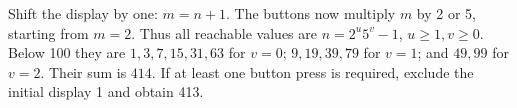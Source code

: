Shift the display by one: $m=n+1$. The buttons now multiply $m$ by 2 or 5, starting from $m=2$. Thus all reachable values are $n=2^u5^v-1$, $u\ge1,v\ge0$. Below 100 they are $1,3,7,15,31,63$ for $v=0$; $9,19,39,79$ for $v=1$; and $49,99$ for $v=2$. Their sum is $\boxed{414}$. If at least one button press is required, exclude the initial display 1 and obtain 413.
